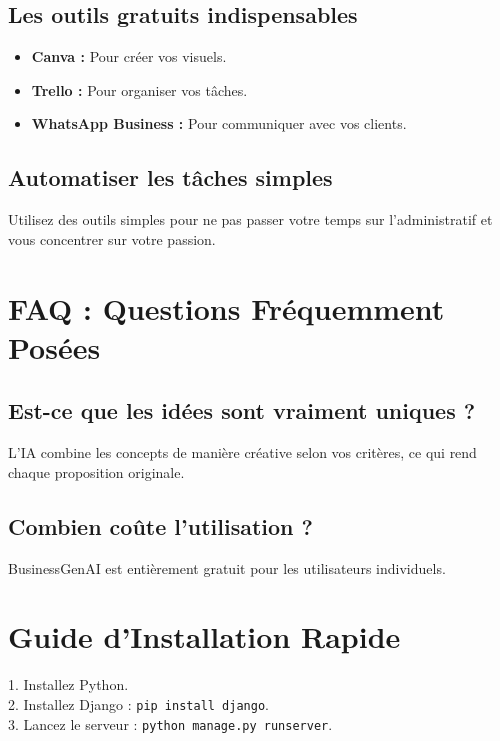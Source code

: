 \documentclass[12pt,a4paper]{report}
\begin{document}
\section{Les outils gratuits indispensables}
\begin{itemize}
    \item \textbf{Canva :} Pour créer vos visuels.
    \item \textbf{Trello :} Pour organiser vos tâches.
    \item \textbf{WhatsApp Business :} Pour communiquer avec vos clients.
\end{itemize}

\section{Automatiser les tâches simples}
Utilisez des outils simples pour ne pas passer votre temps sur l'administratif et vous concentrer sur votre passion.

\newpage

\chapter*{FAQ : Questions Fréquemment Posées}
\section*{Est-ce que les idées sont vraiment uniques ?}
L'IA combine les concepts de manière créative selon vos critères, ce qui rend chaque proposition originale.

\section*{Combien coûte l'utilisation ?}
BusinessGenAI est entièrement gratuit pour les utilisateurs individuels.

\newpage

\chapter*{Guide d'Installation Rapide}
1. Installez Python. \\
2. Installez Django : \texttt{pip install django}. \\
3. Lancez le serveur : \texttt{python manage.py runserver}.
\end{document}
